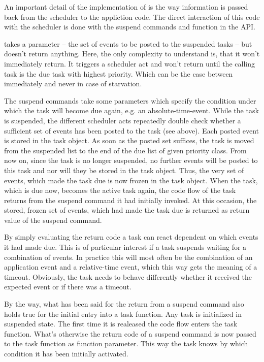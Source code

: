 An important detail of the implementation of \rtos{} is the way
information is passed back from the scheduler to the appliction code. The
direct interaction of this code with the scheduler is done with the
suspend commands and function  in the \rtos{} API.

 takes a parameter -- the set of events to be posted to
the suspended tasks -- but doesn't return anything. Here, the only
complexity to understand is, that it won't immediately return. It triggers
a scheduler act and won't return until the calling task is the due task
with highest priority. Which can be the case between immediately and never
in case of starvation.

The suspend commands take some parameters which specify the condition
under which the task will become due again, e.g. an absolute-time-event.
While the task is suspended, the different scheduler acts repeatedly double
check whether a sufficient set of events has been posted to the task (see
above). Each posted event is stored in the task object. As soon as the
posted set suffices, the task is moved from the suspended list to the end
of the due list of given priority class. From now on, since the task is no
longer suspended, no further events will be posted to this task and nor
will they be stored in the task object. Thus, the very set of events, which
made the task due is now frozen in the task object. When the task, which
is due now, becomes the active task again, the code flow of the task
returns from the suspend command it had initially invoked. At this
occasion, the stored, frozen set of events, which had made the task due is
returned as return value of the suspend command.

By simply evaluating the return code a task can react dependent on which
events it had made due. This is of particular interest if a task suspends
waiting for a combination of events. In practice this will most often be
the combination of an application event and a relative-time event, which
this way gets the meaning of a timeout. Obviously, the task needs to
behave differently whether it received the expected event or if there was
a timeout.

By the way, what has been said for the return from a suspend command also
holds true for the initial entry into a task function. Any task is
initialized in suspended state. The first time it is realeased the code
flow enters the task function. What's otherwise the return code of a
suspend command is now passed to the task function as function parameter.
This way the task knows by which condition it has been initially
activated.


